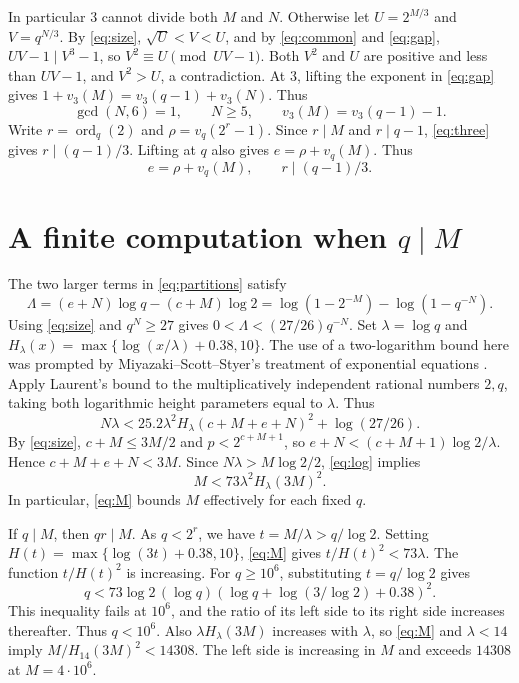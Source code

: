 \documentclass[11pt]{article}
\DeclareMathOperator{\ord}{ord}
\begin{document}
In particular $3$ cannot divide both $M$ and $N$. Otherwise let
$U=2^{M/3}$ and $V=q^{N/3}$. By \eqref{eq:size},
$\sqrt U<V<U$, and by \eqref{eq:common} and \eqref{eq:gap},
$UV-1\mid V^3-1$, so $V^2\equiv U\pmod{UV-1}$.
Both $V^2$ and $U$ are positive and less than $UV-1$, and
$V^2>U$, a contradiction.
At $3$, lifting the exponent in \eqref{eq:gap} gives
$1+v_3(M)=v_3(q-1)+v_3(N)$. Thus
\begin{equation}\label{eq:three}
\gcd(N,6)=1,\qquad N\ge5,\qquad v_3(M)=v_3(q-1)-1.
\end{equation}
Write $r=\ord_q(2)$ and $\rho=v_q(2^r-1)$. Since $r\mid M$ and
$r\mid q-1$, \eqref{eq:three} gives $r\mid(q-1)/3$. Lifting at $q$
also gives $e=\rho+v_q(M)$. Thus
\begin{equation}\label{eq:qval}
e=\rho+v_q(M),\qquad r\mid(q-1)/3.
\end{equation}

\section{A finite computation when \texorpdfstring{$q\mid M$}{q divides M}}
\label{sec:finite}

The two larger terms in \eqref{eq:partitions} satisfy
\[
\Lambda=(e+N)\log q-(c+M)\log2
=\log(1-2^{-M})-\log(1-q^{-N}).
\]
Using \eqref{eq:size} and $q^N\ge27$ gives
$0<\Lambda<(27/26)q^{-N}$. Set $\lambda=\log q$ and
$H_\lambda(x)=\max\{\log(x/\lambda)+0.38,10\}$.
The use of a two-logarithm bound here was prompted by
Miyazaki--Scott--Styer's treatment of exponential equations
\cite[Proposition~6.1]{MSS}.
Apply Laurent's bound \cite[Corollary~2, $(m,C_2)=(10,25.2)$]{Laurent}
to the multiplicatively independent rational numbers $2,q$, taking
both logarithmic height parameters equal to $\lambda$. Thus
\begin{equation}\label{eq:log}
N\lambda<25.2\lambda^2 H_\lambda(c+M+e+N)^2+\log(27/26).
\end{equation}
By \eqref{eq:size}, $c+M\le3M/2$ and $p<2^{c+M+1}$, so
$e+N<(c+M+1)\log2/\lambda$. Hence $c+M+e+N<3M$.
Since $N\lambda>M\log2/2$, \eqref{eq:log} implies
\begin{equation}\label{eq:M}
M<73\lambda^2 H_\lambda(3M)^2.
\end{equation}
In particular, \eqref{eq:M} bounds $M$ effectively for each fixed $q$.

If $q\mid M$, then $qr\mid M$. As $q<2^r$, we have
$t=M/\lambda>q/\log2$. Setting $H(t)=\max\{\log(3t)+0.38,10\}$,
\eqref{eq:M} gives $t/H(t)^2<73\lambda$. The function $t/H(t)^2$
is increasing. For $q\ge10^6$, substituting $t=q/\log2$ gives
\[
q<73\log2\,(\log q)(\log q+\log(3/\log2)+0.38)^2.
\]
This inequality fails at $10^6$, and the ratio of its left side to its
right side increases thereafter. Thus $q<10^6$. Also
$\lambda H_\lambda(3M)$ increases with $\lambda$, so \eqref{eq:M}
and $\lambda<14$ imply $M/H_{14}(3M)^2<14308$. The left side is
increasing in $M$ and exceeds $14308$ at $M=4\cdot10^6$.
\end{document}

